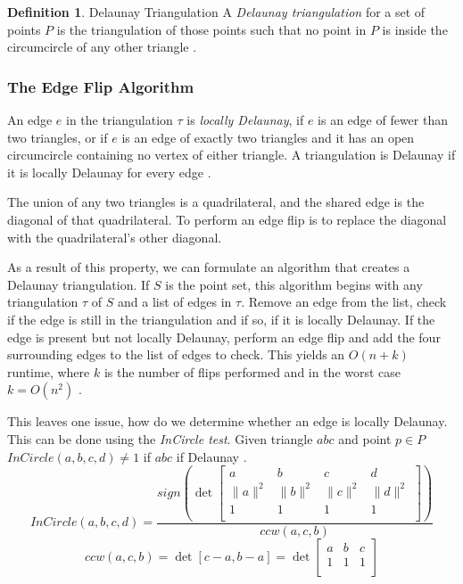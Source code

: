 \documentclass[11pt]{article}
\theoremstyle{definition}
\newtheorem{definition}{Definition}[section]
\begin{document}
  	\theoremstyle{definition}
  	\begin{definition}{Delaunay Triangulation}
		A \emph{Delaunay triangulation} for a set of points $P$ is the triangulation of those points such that no point in $P$ is inside the circumcircle of any other triangle \cite{meshGeneration}.
	\end{definition}
	
\subsubsection{The Edge Flip Algorithm}
	An edge $e$ in the triangulation $\tau$ is \emph{locally Delaunay}, if $e$ is an edge of fewer than two triangles, or if $e$ is an edge of exactly two triangles and it has an open circumcircle containing no vertex of either triangle. 
	A triangulation is Delaunay if it is locally Delaunay for every edge \cite{meshGeneration}.

	The union of any two triangles is a quadrilateral, and the shared edge is the diagonal of that quadrilateral. 
	To perform an edge flip is to replace the diagonal with the quadrilateral's other diagonal.

	As a result of this property, we can formulate an algorithm that creates a Delaunay triangulation. 
	If $S$ is the point set, this algorithm begins with any triangulation $\tau$ of $S$ and a list of edges in $\tau$. 
	Remove an edge from the list, check if the edge is still in the triangulation and if so, if it is locally Delaunay. 
	If the edge is present but not locally Delaunay, perform an edge flip and add the four surrounding edges to the list of edges to check. 
	This yields an $O(n + k)$ runtime, where $k$ is the number of flips performed and in the worst case $k = O(n^2)$ \cite{meshGeneration}.

	This leaves one issue, how do we determine whether an edge is locally Delaunay. 
	This can be done using the \emph{InCircle test}. 
	Given triangle $abc$ and point $p \in P$ $InCircle(a,b,c,d) \neq 1$ if $abc$ if Delaunay \cite{princeton:CCW}. 
	\begin{equation}
		InCircle(a,b,c,d) = \frac{sign(\det
		\begin{bmatrix}
    			a & b & c & d \\
    			\|a\|^2 & \|b\|^2 & \|c\|^2 & \|d\|^2 \\
    			1 & 1 & 1 & 1 \\
		\end{bmatrix} 
		)}{ccw(a,c,b)}
	\end{equation}
	\begin{equation}
		ccw(a,c,b) = \det[c-a,b-a] = \det
		\begin{bmatrix}
    			a & b & c \\
    			1 & 1 & 1\\
		\end{bmatrix} 
	\end{equation} 
	
\end{document}
